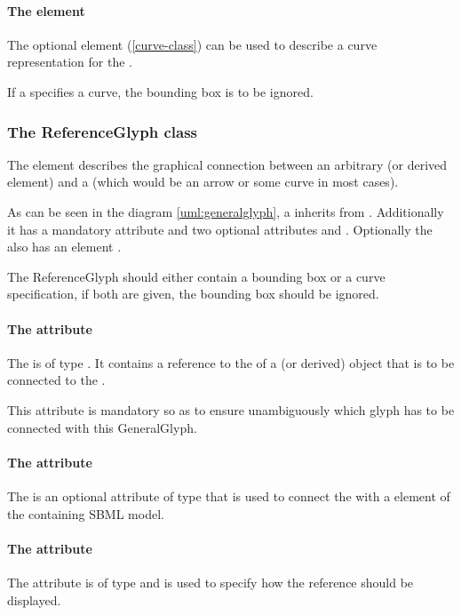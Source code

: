\paragraph {The  element}
The optional \Curve element (\ref{curve-class}) can be used to describe 
a curve representation for the \GeneralGlyph. 

If a \GeneralGlyph specifies a curve, the bounding box is to be ignored. 

\subsubsection{The ReferenceGlyph class}
\label{referenceglyph-class}
The  element describes the graphical connection 
between an arbitrary \GraphicalObject (or derived element) and a 
\GeneralGlyph (which would be an arrow or some curve in most cases). 

As can be seen in the diagram \ref{uml:generalglyph}, a \ReferenceGlyph 
inherits from \GraphicalObject. Additionally it has a mandatory 
attribute  and two optional attributes  
and . Optionally the \ReferenceGlyph also has an element 
. 

The ReferenceGlyph should either contain a bounding box or a curve 
specification, if both are given, the bounding box should be ignored. 

\paragraph{The  attribute}
The  is of type . It contains a reference 
to the  of a \GraphicalObject (or derived) object that is to 
be connected to the \GeneralGlyph. 

This attribute is mandatory so as to ensure unambiguously which glyph has to be 
connected with this GeneralGlyph. 


\paragraph{The  attribute}
The  is an optional attribute of type  
that is used to connect the \ReferenceGlyph with a element of the 
containing SBML model. 

\paragraph{The  attribute}
The  attribute is of type  and is used to 
specify how the reference should be displayed. 

